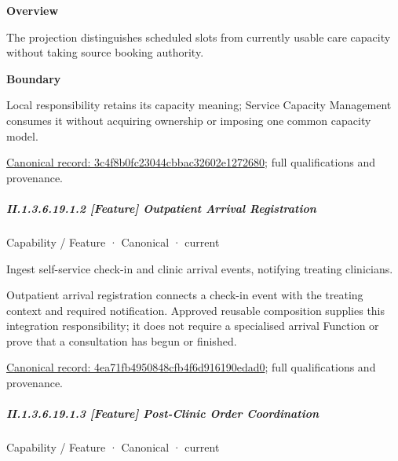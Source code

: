 \textbf{Overview}



The projection distinguishes scheduled slots from currently usable care capacity without taking source booking authority.



\textbf{Boundary}



Local responsibility retains its capacity meaning; Service Capacity Management consumes it without acquiring ownership or imposing one common capacity model.


{\footnotesize \href{../../../../continuum/strategy/capability/feature/3c4f8b0fc23044cbbac32602e1272680.md}{Canonical record: 3c4f8b0fc23044cbbac32602e1272680}; full qualifications and provenance.}\par
\subparagraph*{II.1.3.6.19.1.2 [Feature] Outpatient Arrival Registration}
\label{navigation:II.1.3.6.19.1.2}

\label{element:4ea71fb4950848cfb4f6d916190edad0}
{\small Capability / Feature · Canonical · current}\par

Ingest self-service check-in and clinic arrival events, notifying treating clinicians.



Outpatient arrival registration connects a check-in event with the treating context and required notification. Approved reusable composition supplies this integration responsibility; it does not require a specialised arrival Function or prove that a consultation has begun or finished.


{\footnotesize \href{../../../../continuum/strategy/capability/feature/4ea71fb4950848cfb4f6d916190edad0.md}{Canonical record: 4ea71fb4950848cfb4f6d916190edad0}; full qualifications and provenance.}\par
\subparagraph*{II.1.3.6.19.1.3 [Feature] Post-Clinic Order Coordination}
\label{navigation:II.1.3.6.19.1.3}

\label{element:439b3530b7c9443ab3e48d2cc50a3b0c}
{\small Capability / Feature · Canonical · current}\par

